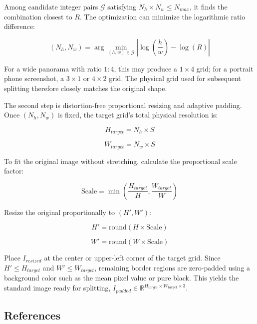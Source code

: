 Among candidate integer pairs \(\mathcal{G}\) satisfying \(N_h\times N_w\le N_{max}\), it finds the combination closest to \(R\). The optimization can minimize the logarithmic ratio difference:

\[
(N_h,N_w)=\arg\min_{(h,w)\in\mathcal{G}}\left|\log\left(\frac{h}{w}\right)-\log(R)\right|
\]

For a wide panorama with ratio \(1:4\), this may produce a \(1\times4\) grid; for a portrait phone screenshot, a \(3\times1\) or \(4\times2\) grid. The physical grid used for subsequent splitting therefore closely matches the original shape.

The second step is distortion-free proportional resizing and adaptive padding. Once \((N_h,N_w)\) is fixed, the target grid's total physical resolution is:

\[
H_{target}=N_h\times S
\]

\[
W_{target}=N_w\times S
\]

To fit the original image without stretching, calculate the proportional scale factor:

\[
\mathrm{Scale}=\min\left(\frac{H_{target}}{H},\frac{W_{target}}{W}\right)
\]

Resize the original proportionally to \((H',W')\):

\[
H'=\mathrm{round}(H\times\mathrm{Scale})
\]

\[
W'=\mathrm{round}(W\times\mathrm{Scale})
\]

Place \(I_{resized}\) at the center or upper-left corner of the target grid. Since \(H'\le H_{target}\) and \(W'\le W_{target}\), remaining border regions are zero-padded using a background color such as the mean pixel value or pure black. This yields the standard image ready for splitting, \(I_{padded}\in\mathbb{R}^{H_{target}\times W_{target}\times3}\).

\FloatBarrier
{}
\hypertarget{references-78}{%
\subsection{References}\label{references-78}}


